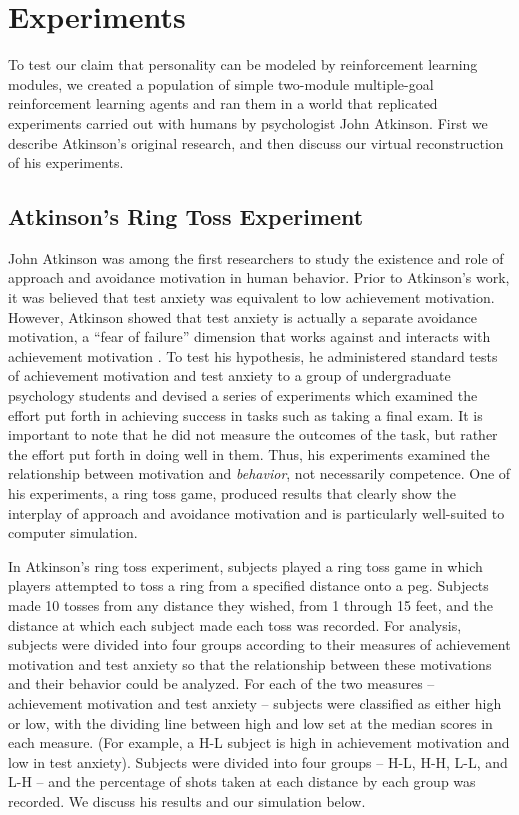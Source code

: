 \section{Experiments}

To test our claim that personality can be modeled by reinforcement learning modules, we created a population of simple two-module multiple-goal reinforcement learning agents and ran them in a world that replicated experiments carried out with humans by psychologist John Atkinson.  First we describe Atkinson's original research, and then discuss our virtual reconstruction of his experiments.

\subsection{Atkinson's Ring Toss Experiment}\label{sec:ring-toss}

John Atkinson was among the first researchers to study the existence and role of approach and avoidance motivation in human behavior. Prior to Atkinson's work, it was believed that test anxiety was equivalent to low achievement motivation.  However, Atkinson showed that test anxiety is actually a separate avoidance motivation, a ``fear of failure'' dimension that works against and interacts with achievement motivation \cite{atkinson1960achievement}.  To test his hypothesis, he administered standard tests of achievement motivation and test anxiety to a group of undergraduate psychology students and devised a series of experiments which examined the effort put forth in achieving success in tasks such as taking a final exam.  It is important to note that he did not measure the outcomes of the task, but rather the effort put forth in doing well in them.  Thus, his experiments examined the relationship between motivation and {\em behavior}, not necessarily competence.  One of his experiments, a ring toss game, produced results that clearly show the interplay of approach and avoidance motivation and is particularly well-suited to computer simulation.

In Atkinson's ring toss experiment, subjects played a ring toss game in which players attempted to toss a ring from a specified distance onto a peg.  Subjects made 10 tosses from any distance they wished, from 1 through 15 feet, and the distance at which each subject made each toss was recorded.  For analysis, subjects were divided into four groups according to their measures of achievement motivation and test anxiety so that the relationship between these motivations and their behavior could be analyzed.  For each of the two measures -- achievement motivation and test anxiety -- subjects were classified as either high or low, with the dividing line between high and low set at the median scores in each measure.  (For example, a H-L subject is high in achievement motivation and low in test anxiety).  Subjects were divided into four groups -- H-L, H-H, L-L, and L-H -- and the percentage of shots taken at each distance by each group was recorded. We discuss his results and our simulation below.

